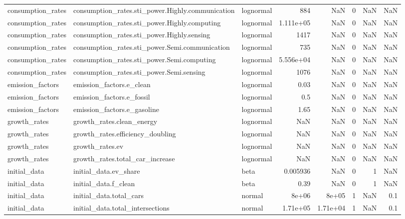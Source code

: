 \begin{longtable}{lllrrrrr}
consumption\_rates & consumption\_rates.sti\_power.Highly.communication & lognormal & 884 & NaN & 0 & NaN & NaN \\
consumption\_rates & consumption\_rates.sti\_power.Highly.computing & lognormal & 1.111e+05 & NaN & 0 & NaN & NaN \\
consumption\_rates & consumption\_rates.sti\_power.Highly.sensing & lognormal & 1417 & NaN & 0 & NaN & NaN \\
consumption\_rates & consumption\_rates.sti\_power.Semi.communication & lognormal & 735 & NaN & 0 & NaN & NaN \\
consumption\_rates & consumption\_rates.sti\_power.Semi.computing & lognormal & 5.556e+04 & NaN & 0 & NaN & NaN \\
consumption\_rates & consumption\_rates.sti\_power.Semi.sensing & lognormal & 1076 & NaN & 0 & NaN & NaN \\
emission\_factors & emission\_factors.e\_clean & lognormal & 0.03 & NaN & 0 & NaN & NaN \\
emission\_factors & emission\_factors.e\_fossil & lognormal & 0.5 & NaN & 0 & NaN & NaN \\
emission\_factors & emission\_factors.e\_gasoline & lognormal & 1.65 & NaN & 0 & NaN & NaN \\
growth\_rates & growth\_rates.clean\_energy & lognormal & NaN & NaN & 0 & NaN & NaN \\
growth\_rates & growth\_rates.efficiency\_doubling & lognormal & NaN & NaN & 0 & NaN & NaN \\
growth\_rates & growth\_rates.ev & lognormal & NaN & NaN & 0 & NaN & NaN \\
growth\_rates & growth\_rates.total\_car\_increase & lognormal & NaN & NaN & 0 & NaN & NaN \\
initial\_data & initial\_data.ev\_share & beta & 0.005936 & NaN & 0 & 1 & NaN \\
initial\_data & initial\_data.f\_clean & beta & 0.39 & NaN & 0 & 1 & NaN \\
initial\_data & initial\_data.total\_cars & normal & 8e+06 & 8e+05 & 1 & NaN & 0.1 \\
initial\_data & initial\_data.total\_intersections & normal & 1.71e+05 & 1.71e+04 & 1 & NaN & 0.1 \\
\end{longtable}
